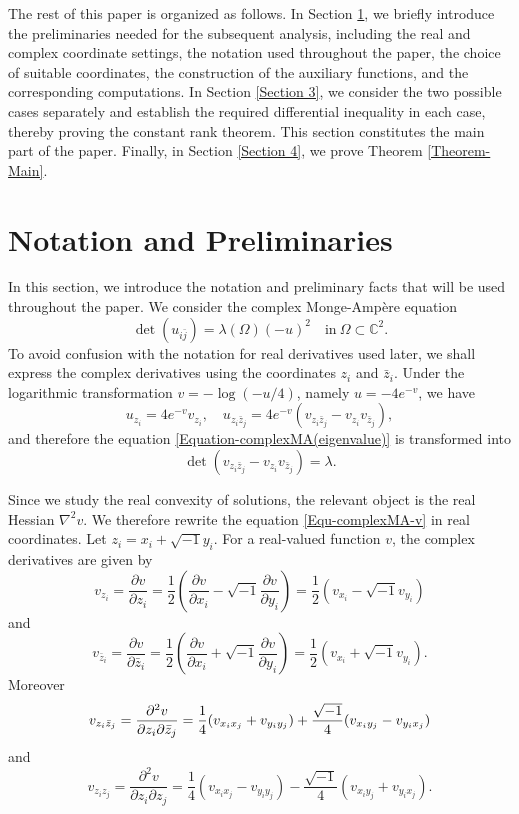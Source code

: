 \documentclass[11pt]{amsart}
\numberwithin{theorem}{section}
\numberwithin{equation}{section}
\begin{document}
The rest of this paper is organized as follows. In Section \ref{Section 2}, we briefly introduce the preliminaries needed for the subsequent analysis, including the real and complex coordinate settings, the notation used throughout the paper, the choice of suitable coordinates, the construction of the auxiliary functions, and the corresponding computations. In Section \ref{Section 3}, we consider the two possible cases separately and establish the required differential inequality in each case, thereby proving the constant rank theorem. This section constitutes the main part of the paper. Finally, in Section \ref{Section 4}, we prove Theorem \ref{Theorem-Main}.

\section{Notation and Preliminaries}\label{Section 2}

In this section, we introduce the notation and preliminary facts that will be used throughout the paper. We consider the complex Monge-Amp\`{e}re equation
\begin{equation}\label{Equation-complexMA(eigenvalue)}
\det(u_{i\bar{j}})=\lambda(\Omega)(-u)^2\quad \mathrm{in}\ \Omega\subset\mathbb{C}^2.
\end{equation}
To avoid confusion with the notation for real derivatives used later, we shall express the complex derivatives using the coordinates $z_i$ and $\bar{z}_i$. Under the logarithmic transformation $v=-\log(-u/4)$, namely $u=-4e^{-v}$, we have $$u_{z_i}=4e^{-v}v_{z_i},\quad u_{z_i\bar{z}_j}=4e^{-v}(v_{z_i\bar{z}_j}-v_{z_i}v_{\bar{z}_j}),$$ and therefore the equation \eqref{Equation-complexMA(eigenvalue)} is transformed into
\begin{equation}\label{Equ-complexMA-v}
\det(v_{z_i\bar{z}_j}-v_{z_i}v_{\bar{z}_j})=\lambda.
\end{equation}

Since we study the real convexity of solutions, the relevant object is the real Hessian $\nabla^2v$. We therefore rewrite the equation \eqref{Equ-complexMA-v} in real coordinates. Let $z_i=x_i+\sqrt{-1}y_i$. For a real-valued function $v$, the complex derivatives are given by $$v_{z_i}=\frac{\partial v}{\partial z_i}=\frac{1}{2}\left(\frac{\partial v}{\partial x_i}-\sqrt{-1}\frac{\partial v}{\partial y_i}\right)=\frac{1}{2}(v_{x_i}-\sqrt{-1}v_{y_i})$$ and $$v_{\bar{z}_i}=\frac{\partial v}{\partial\bar{z}_i}=\frac{1}{2}\left(\frac{\partial v}{\partial x_i}+\sqrt{-1}\frac{\partial v}{\partial y_i}\right)=\frac{1}{2}(v_{x_i}+\sqrt{-1}v_{y_i}).$$ Moreover
\begin{equation}\label{Equality-v_{ibarj}}
v_{z_i\bar{z}_j}=\frac{\partial^2v}{\partial z_i\partial\bar{z}_j}=\frac{1}{4}(v_{x_ix_j}+v_{y_iy_j})+\frac{\sqrt{-1}}{4}(v_{x_iy_j}-v_{y_ix_j})
\end{equation}
and $$v_{z_iz_j}=\frac{\partial^2v}{\partial z_i\partial z_j}=\frac{1}{4}(v_{x_ix_j}-v_{y_iy_j})-\frac{\sqrt{-1}}{4}(v_{x_iy_j}+v_{y_ix_j}).$$
\end{document}
